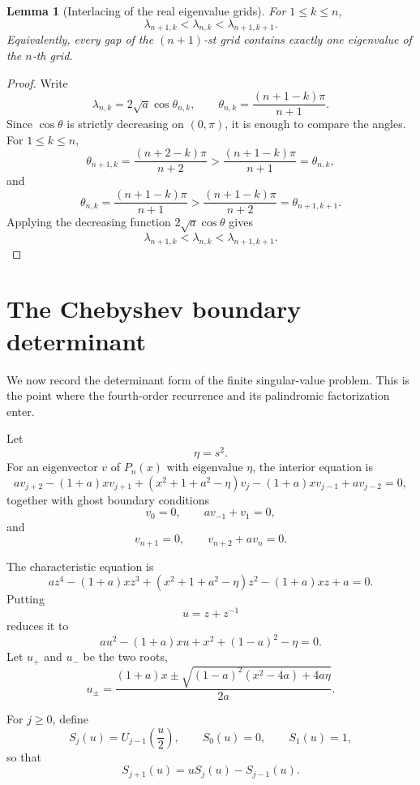 \documentclass[11pt]{amsart}
\numberwithin{equation}{section}
\newtheorem{lemma}[theorem]{Lemma}
\begin{document}
\begin{lemma}[Interlacing of the real eigenvalue grids]\label{lem:grid-interlacing}
For \(1\le k\le n\),
\[
        \lambda_{n+1,k}
        <
        \lambda_{n,k}
        <
        \lambda_{n+1,k+1}.
\]
Equivalently, every gap of the \((n+1)\)-st grid contains exactly one
eigenvalue of the \(n\)-th grid.
\end{lemma}

\begin{proof}
Write
\[
        \lambda_{n,k}=2\sqrt a\cos\theta_{n,k},
        \qquad
        \theta_{n,k}=\frac{(n+1-k)\pi}{n+1}.
\]
Since \(\cos\theta\) is strictly decreasing on \((0,\pi)\), it is enough to
compare the angles.  For \(1\le k\le n\),
\[
        \theta_{n+1,k}
        =
        \frac{(n+2-k)\pi}{n+2}
        >
        \frac{(n+1-k)\pi}{n+1}
        =
        \theta_{n,k},
\]
and
\[
        \theta_{n,k}
        =
        \frac{(n+1-k)\pi}{n+1}
        >
        \frac{(n+1-k)\pi}{n+2}
        =
        \theta_{n+1,k+1}.
\]
Applying the decreasing function \(2\sqrt a\cos\theta\) gives
\[
        \lambda_{n+1,k}
        <
        \lambda_{n,k}
        <
        \lambda_{n+1,k+1}.
\]
\end{proof}

\section{The Chebyshev boundary determinant}

We now record the determinant form of the finite singular-value problem.
This is the point where the fourth-order recurrence and its palindromic
factorization enter.

Let
\[
        \eta=s^2.
\]
For an eigenvector \(v\) of \(P_n(x)\) with eigenvalue \(\eta\), the interior
equation is
\[
        a v_{j+2}
        -(1+a)xv_{j+1}
        +(x^2+1+a^2-\eta)v_j
        -(1+a)xv_{j-1}
        +a v_{j-2}
        =
        0,
\]
together with ghost boundary conditions
\[
        v_0=0,\qquad av_{-1}+v_1=0,
\]
and
\[
        v_{n+1}=0,\qquad v_{n+2}+av_n=0.
\]

The characteristic equation is
\[
        a z^4-(1+a)xz^3+(x^2+1+a^2-\eta)z^2-(1+a)xz+a=0.
\]
Putting
\[
        u=z+z^{-1}
\]
reduces it to
\[
        a u^2-(1+a)xu+x^2+(1-a)^2-\eta=0.
\]
Let \(u_+\) and \(u_-\) be the two roots,
\[
        u_\pm
        =
        \frac{(1+a)x
        \pm
        \sqrt{(1-a)^2(x^2-4a)+4a\eta}}
        {2a}.
\]

For \(j\ge0\), define
\[
        S_j(u)=U_{j-1}\!\left(\frac u2\right),
        \qquad S_0(u)=0,\qquad S_1(u)=1,
\]
so that
\[
        S_{j+1}(u)=uS_j(u)-S_{j-1}(u).
\]
\end{document}
